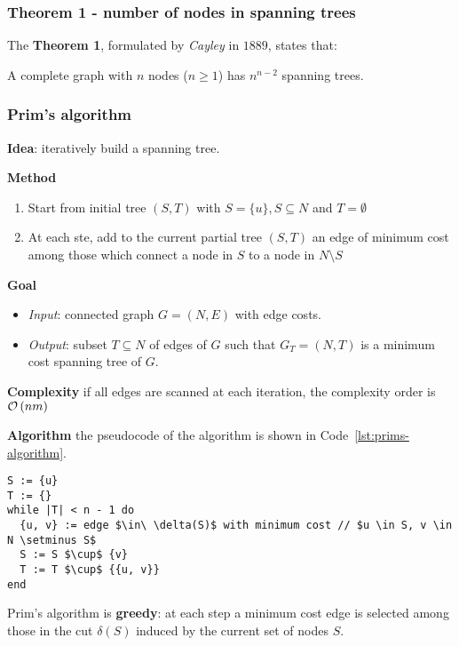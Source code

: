 \documentclass[english]{article}
\begin{document}
\subsubsection{Theorem 1 - number of nodes in spanning trees}

The \textbf{Theorem 1}, formulated by \textit{Cayley} in \(1889\), states that:

A complete graph with \(n\) nodes (\(n \geq 1\)) has \(n^{n-2}\) spanning trees.

\subsubsection{Prim's algorithm}

\textbf{Idea}: iteratively build a spanning tree.

\bigskip
\textbf{Method}
\begin{enumerate}
  \item Start from initial tree \((S, T)\) with \(S = \{u\}, S \subseteq N\) and \(T = \emptyset\)
  \item At each ste, add to the current partial tree \((S, T)\) an edge of minimum cost among those which connect a node in \(S\) to a node in \(N \setminus S\)
\end{enumerate}

\bigskip
\textbf{Goal}
\begin{itemize}[label=\(\rightarrow\)]
  \item \textit{Input}: connected graph \(G = (N, E)\) with edge costs.
  \item \textit{Output}: subset \(T \subseteq N\) of edges of \(G\) such that \(G_T = (N, T)\) is a minimum cost spanning tree of \(G\).
\end{itemize}

\bigskip
\textbf{Complexity}
if all edges are scanned at each iteration, the complexity order is \(\mathcal{O}\left(nm\right)\)

\bigskip
\textbf{Algorithm}
the pseudocode of the algorithm is shown in Code~\ref{lst:prims-algorithm}.

\begin{lstlisting}[style=custom, language=pseudocode, caption={Prim's algorithm}, label={lst:prims-algorithm}]
S := {u}
T := {}
while |T| < n - 1 do
  {u, v} := edge $\in\ \delta(S)$ with minimum cost // $u \in S, v \in N \setminus S$
  S := S $\cup$ {v}
  T := T $\cup$ {{u, v}}
end
\end{lstlisting}

\bigskip
Prim's algorithm is \textbf{greedy}:
at each step a minimum cost edge is selected among those in the cut \(\delta(S)\) induced by the current set of nodes \(S\).
\end{document}
